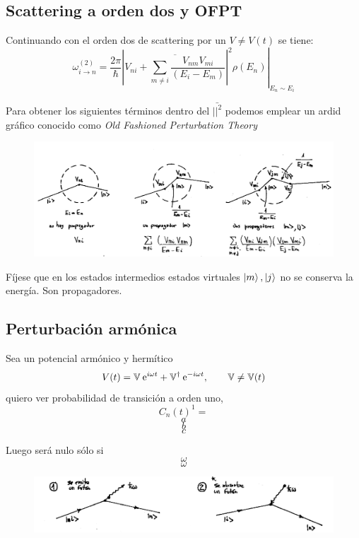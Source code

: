 \documentclass[10pt,oneside]{CBFT_book}
\begin{document}
\subsection{Scattering a orden dos y OFPT}

Continuando con el orden dos de scattering por un $V\neq V(t)$ se tiene:
\[
	\omega_{i\to n}^{(2)} = \frac{2\pi}{\hbar}\left. \left| \overline{ V_{ni} + \sum_{m\neq i} 
	\frac{V_{nm}V_{mi}}{(E_i-E_m)}} \right|^2 \rho(E_n) \right|_{E_n\sim E_i}
\]

Para obtener los siguientes términos dentro del $\bar{||^2}$ podemos emplear un ardid gráfico conocido como 
{\it Old Fashioned Perturbation Theory}

\begin{figure}[!thb]
	\begin{center}
	\includegraphics[width=1.0\textwidth]{images/teo2_24.pdf}
	\end{center}
	\caption{}
\end{figure} 


Fíjese que en los estados intermedios estados virtuales $\Ket{m},\Ket{j}$ no se conserva la energía. Son 
propagadores.


\subsection{Perturbación armónica}

Sea un potencial armónico y hermítico 
\[
	V(t) = \mathbb{V} \:\mathrm{e}^{i\omega t} + \mathbb{V}^\dagger \:\mathrm{e}^{-i\omega t},
		\qquad \mathbb{V}\neq \mathbb{V}(t)
\]
quiero ver probabilidad de transición a orden uno,
\[
	C_n(t)^1 = 
\]
\[
	a
\]
\[
	b
\]
\[
	c
\]

Luego será nulo sólo si 
\[
	\omega
\]
\[
	\omega
\]

\begin{figure}[htb]
	\begin{center}
	\includegraphics[width=1.0\textwidth]{images/teo2_25.pdf}
	\end{center}
	\caption{}
\end{figure} 
\end{document}
